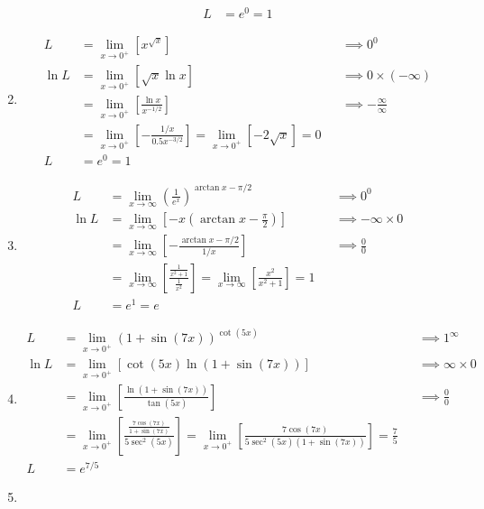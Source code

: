 \documentclass[12pt, A4]{report}
\begin{document}
\begin{enumerate}
\begin{align*}
						L &= e^0 
								= 1
					\end{align*}
				\item
					\begin{align*}
						L &= \lim_{x\to 0^+}\left[x^{\sqrt{x}}\right] 
							&&\implies 0^0 \\
						\ln L &= \lim_{x\to 0^+}\left[\sqrt{x}\ln x\right] 
							&&\implies 0 \times (-\infty) \\
						&= \lim_{x\to 0^+}\left[\frac{\ln x}{x^{-1/2}}\right] 
							&&\implies -\frac{\infty}{\infty} \\
						&= \lim_{x\to 0^+}\left[-\frac{1/x}{0.5x^{-3/2}}\right] 
							= \lim_{x\to 0^+}\left[-2\sqrt{x}\right] = 0 \\
						L &= e^0 
								= 1
					\end{align*}
				\item
					\begin{align*}
						L &= \lim_{x\to\infty}\left(\frac{1}{e^x}\right)^{\arctan x - \pi/2}
								&&\implies 0^0 \\
						\ln L &= \lim_{x\to\infty}\left[-x\left(\arctan x - \frac{\pi}{2}\right)\right]
								&&\implies -\infty \times 0 \\
							&= \lim_{x\to\infty}\left[-\frac{\arctan x - \pi/2}{1/x}\right]
								&&\implies \frac{0}{0} \\
							&= \lim_{x\to\infty}\left[\frac{\frac{1}{x^2 + 1}}{\frac{1}{x^2}}\right]
								= \lim_{x\to\infty}\left[\frac{x^2}{x^2 + 1}\right] = 1 \\
						L &= e^1
								= e
					\end{align*}
				\item
					\begin{align*}
						L &= \lim_{x\to 0^+}(1 + \sin(7x))^{\cot(5x)}
								&&\implies 1^\infty \\
						\ln L &= \lim_{x\to 0^+}[\cot(5x)\ln(1 + \sin(7x))]
								&&\implies \infty \times 0 \\
							&= \lim_{x\to 0^+}\left[\frac{\ln(1 + \sin(7x))}{\tan(5x)}\right]
								&&\implies \frac{0}{0} \\
							&= \lim_{x\to 0^+}\left[\frac{\frac{7\cos(7x)}{1 + \sin(7x)}}{5\sec^2(5x)}\right]
									= \lim_{x\to 0^+}\left[\frac{7\cos(7x)}{5\sec^2(5x)(1 + \sin(7x))}\right]
									= \frac{7}{5} \\
						L &= e^{7/5}
					\end{align*}
				\item
					\begin{align*}

\end{align*}
\end{enumerate}
\end{document}
